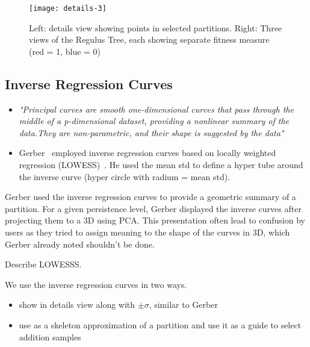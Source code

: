 
\begin{figure}[thb]
    \begin{center}
     \texttt{[image: details-3]}
    \caption{Left: details view showing points in selected partitions. Right: Three views of the Regulus Tree, each showing separate fitness measure (red = 1, blue = 0)}
    \label{fig:details}
    \end{center}
\end{figure}

\subsection{Inverse Regression Curves}
\label{sec:inverse-curves}

\begin{itemize}
    \item \textit{"Principal curves are smooth one-dimensional curves that pass through the middle of a p-dimensional dataset, providing a nonlinear summary of the data.They are non-parametric, and their shape is suggested by the data"}~\cite{Tibshirani92}
    \item Gerber~\cite{Gerber10} employed inverse regression curves based on locally weighted regression (LOWESS)~\cite{Cleveland88}. He used the mean std to define a hyper tube around the inverse curve (hyper circle with radium = mean std).
\end{itemize}

Gerber used the inverse regression curves to provide a geometric summary of a partition. For a given persistence level, Gerber displayed the inverse curves after projecting them to a 3D using PCA. This presentation often lead to confusion by users as they tried to assign meaning to the shape of the curves in 3D, which Gerber already noted shouldn't be done.

Describe LOWESSS.

We use the inverse regression curves in two ways. 
\begin{itemize}
    \item show in details view along with $\pm \sigma$, similar to Gerber
    \item use as a skeleton approximation of a partition and use it as a guide to select addition samples
\end{itemize}

